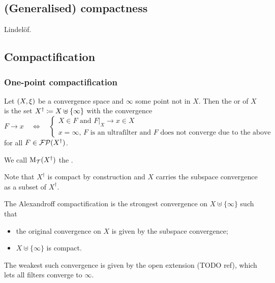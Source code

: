 \subsection{(Generalised) compactness}
Lindelöf.

\subsection{Compactification}
\subsubsection{One-point compactification}
\begin{definition}
Let $\sSet{X,\xi}$ be a convergence space and $\infty$ some point not in $X$. Then the  or  of $X$ is the set $X^\dagger \coloneqq X\uplus \{\infty\}$ with the convergence
\[ F\to x \quad\iff\quad \begin{cases}
\text{$X\in F$ and $F|_X \to x\in X$} \\
\text{$x=\infty$, $F$ is an ultrafilter and $F$ does not converge due to the above}
\end{cases} \]
for all $F\in\operatorname{\mathcal{FP}}(X^\dagger)$.

We call $\operatorname{M_\mathcal{T}}(X^\dagger)$ the .
\end{definition}
Note that $X^\dagger$ is compact by construction and $X$ carries the subspace convergence as a subset of $X^\dagger$.

The Alexandroff compactification is the strongest convergence on $X\uplus \{\infty\}$ such that
\begin{itemize}
\item the original convergence on $X$ is given by the subspace convergence;
\item $X\uplus \{\infty\}$ is compact.
\end{itemize}
The weakest such convergence is given by the open extension (TODO ref), which lets all filters converge to $\infty$.

